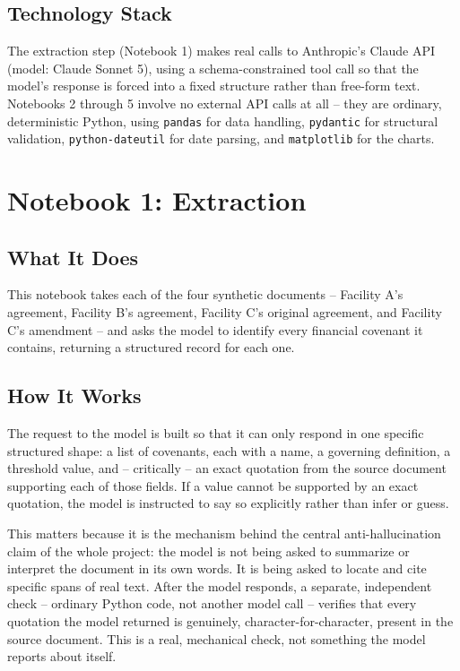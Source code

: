 \documentclass[11pt,a4paper]{article}
\begin{document}
\subsection{Technology Stack}

The extraction step (Notebook 1) makes real calls to Anthropic's Claude API (model: Claude Sonnet 5), using a schema-constrained tool call so that the model's response is forced into a fixed structure rather than free-form text. Notebooks 2 through 5 involve no external API calls at all -- they are ordinary, deterministic Python, using \texttt{pandas} for data handling, \texttt{pydantic} for structural validation, \texttt{python-dateutil} for date parsing, and \texttt{matplotlib} for the charts.

\newpage
\section{Notebook 1: Extraction}

\subsection{What It Does}

This notebook takes each of the four synthetic documents -- Facility A's agreement, Facility B's agreement, Facility C's original agreement, and Facility C's amendment -- and asks the model to identify every financial covenant it contains, returning a structured record for each one.

\subsection{How It Works}

The request to the model is built so that it can only respond in one specific structured shape: a list of covenants, each with a name, a governing definition, a threshold value, and -- critically -- an exact quotation from the source document supporting each of those fields. If a value cannot be supported by an exact quotation, the model is instructed to say so explicitly rather than infer or guess.

This matters because it is the mechanism behind the central anti-hallucination claim of the whole project: the model is not being asked to summarize or interpret the document in its own words. It is being asked to locate and cite specific spans of real text. After the model responds, a separate, independent check -- ordinary Python code, not another model call -- verifies that every quotation the model returned is genuinely, character-for-character, present in the source document. This is a real, mechanical check, not something the model reports about itself.
\end{document}
